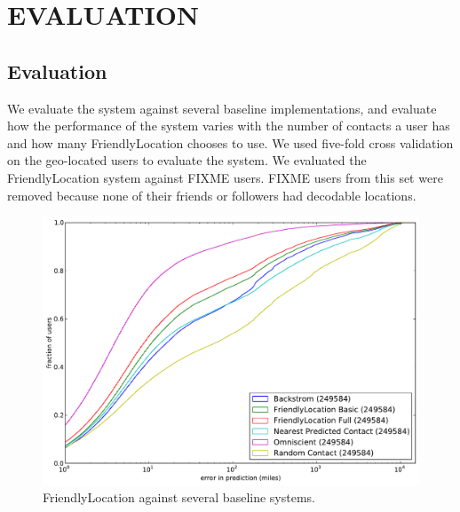 \ifdefined\THESIS
    \chapter{\uppercase{Evaluation}}
\else
    \section{Evaluation}
\fi

We evaluate the system against several baseline implementations, and evaluate
how the performance of the system varies with the number of contacts a user has
and how many FriendlyLocation chooses to use.
We used five-fold cross validation on the geo-located users to evaluate the system.
We evaluated the FriendlyLocation system against FIXME users.
FIXME users from this set were removed because none of their friends or
followers had decodable locations.


\begin{figure}[tb]
\centering
\includegraphics[width=\linewidth]{figures/fl_basic.pdf}
\caption{
    FriendlyLocation against several baseline systems.
}
\label{fig:NearProbFit}
\end{figure}

